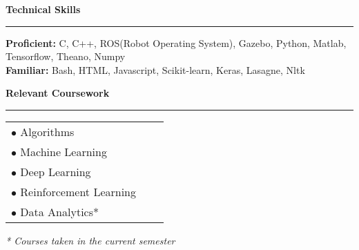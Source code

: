 \documentclass[10pt]{article}
\newcommand{\heading}[1]{
 {\large \textbf{#1}}
  \vspace{0.4em}
  \hrule
  \vspace{0.4em}
}
\newcommand{\EntryGap}{\vspace{0.4  cm}}
\newcommand{\SmallEntryGap}{\vspace{0.2cm}}
\newcommand{\mdot}{$\ \ \cdot\ \ $}
\begin{document}

\EntryGap
\heading{Technical Skills}
\SmallEntryGap
\textbf{Proficient:} C, C++, ROS(Robot Operating System), Gazebo, Python, Matlab, Tensorflow, Theano, Numpy\\
\textbf{Familiar:} Bash, HTML, Javascript, Scikit-learn, Keras, Lasagne, Nltk





\EntryGap
\heading{Relevant Coursework}

\SmallEntryGap
\begin{tabular}{lll}
 $\bullet$ Algorithms\\
 $\bullet$ Machine Learning \\
 $\bullet$ Deep Learning\\
 $\bullet$ Reinforcement Learning\\
 $\bullet$ Data Analytics*\\
\end{tabular}

\SmallEntryGap
\SmallEntryGap
\SmallEntryGap
\emph{* Courses taken in the current semester}
\end{document}
